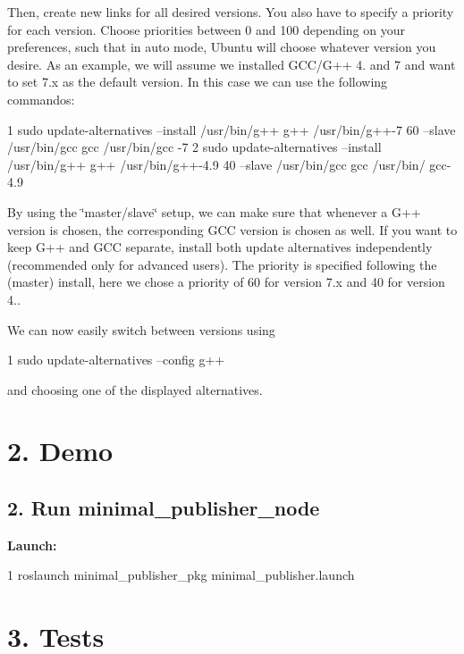 Then, create new links for all desired versions. You also have to specify a priority for each version. Choose priorities between 0 and 100 depending on your preferences, such that in auto mode, Ubuntu will choose whatever version you desire. As an example, we will assume we installed G\+C\+C/\+G++ 4. and 7 and want to set 7.\+x as the default version. In this case we can use the following commandos\+:


\begin{DoxyCode}
1 sudo update-alternatives --install /usr/bin/g++ g++ /usr/bin/g++-7 60 --slave /usr/bin/gcc gcc /usr/bin/gcc
      -7
2 sudo update-alternatives --install /usr/bin/g++ g++ /usr/bin/g++-4.9 40 --slave /usr/bin/gcc gcc /usr/bin/
      gcc-4.9
\end{DoxyCode}


By using the \char`\"{}master/slave\char`\"{} setup, we can make sure that whenever a G++ version is chosen, the corresponding G\+CC version is chosen as well. If you want to keep G++ and G\+CC separate, install both update alternatives independently (recommended only for advanced users). The priority is specified following the (master) install, here we chose a priority of 60 for version 7.\+x and 40 for version 4..

We can now easily switch between versions using


\begin{DoxyCode}
1 sudo update-alternatives --config g++
\end{DoxyCode}


and choosing one of the displayed alternatives. 



\section*{2. Demo}

\subsection*{2. Run minimal\+\_\+publisher\+\_\+node}

{\bfseries Launch\+:}


\begin{DoxyCode}
1 roslaunch minimal\_publisher\_pkg minimal\_publisher.launch
\end{DoxyCode}
 



\section*{3. Tests}

